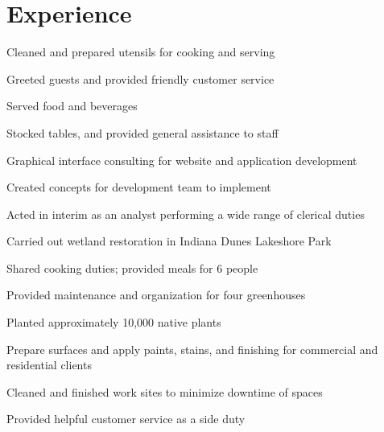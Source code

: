 \documentclass[]{resume-openfont}
\begin{document}
\begin{minipage}[t]{0.66\textwidth} 


\section{Experience}

\vspace{\topsep} %
\begin{tightemize}
\item Cleaned and prepared utensils for cooking and serving
\item Greeted guests and provided friendly customer service
\item Served food and beverages
\item Stocked tables, and provided general assistance to staff
\end{tightemize}
\sectionsep

\begin{tightemize}
\item Graphical interface consulting for website and application development
\item Created concepts for development team to implement
\item Acted in interim as an analyst performing a wide range of clerical duties
\end{tightemize}
\sectionsep

\begin{tightemize}
\item Carried out wetland restoration in Indiana Dunes Lakeshore Park
\item Shared cooking duties; provided meals for 6 people
\item Provided maintenance and organization for four greenhouses
\item Planted approximately 10,000 native plants
\end{tightemize}
\sectionsep

\begin{tightemize}
\item Prepare surfaces and apply paints, stains, and finishing for commercial and residential clients
\item Cleaned and finished work sites to minimize downtime of spaces
\item Provided helpful customer service as a side duty
\end{tightemize}
\sectionsep


\end{minipage}
\end{document}
